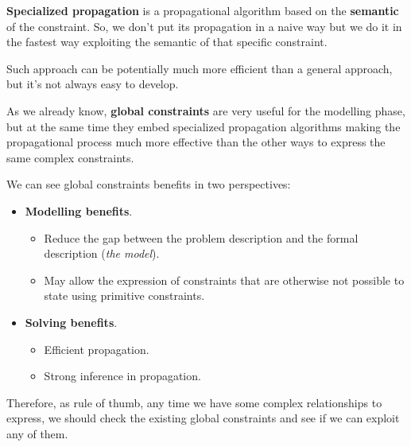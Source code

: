 \textbf{Specialized propagation} is a propagational algorithm based on the \textbf{semantic} of the constraint. So, we don't put its propagation in a naive way but 
we do it in the fastest way exploiting the semantic of that specific constraint. \vspace{7pt}

Such approach can be potentially much more efficient than a general approach, but it's not always easy to develop. \vspace{7pt} 

As we already know, \textbf{global constraints} are very useful for the modelling phase, but at the same time they embed specialized propagation algorithms
making the propagational process much more effective than the other ways to express the same complex constraints. \vspace{7pt}

We can see global constraints benefits in two perspectives:
\begin{itemize}
    \renewcommand{\labelitemi}{-}
    \item \textbf{Modelling benefits}. 
    \begin{itemize}
        \item Reduce the gap between the problem description and the formal description (\textit{the model}).
        \item May allow the expression of constraints that are otherwise not possible to state using primitive constraints.
    \end{itemize} 
    \item \textbf{Solving benefits}. 
    \begin{itemize}
        \item Efficient propagation.
        \item Strong inference in propagation.
    \end{itemize} 
\end{itemize}
Therefore, as rule of thumb, any time we have some complex relationships to express, we should check the existing global constraints and see if we can exploit 
any of them.  